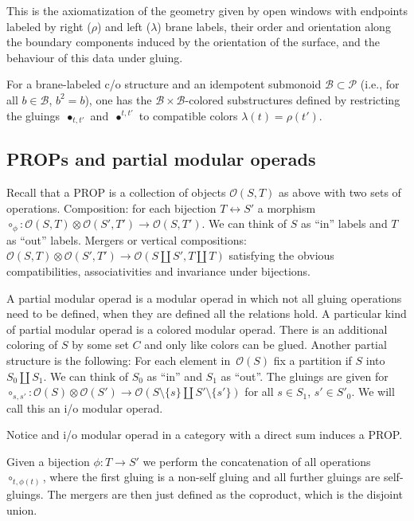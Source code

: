 \documentclass[pdftex]{sigma}
\def\calO{{\mathcal O}}
\def\B{\mathcal B}
\begin{document}
This is the axiomatization  of the geometry given by open windows
with endpoints labeled by right ($\rho$) and left ($\lambda $) brane labels, their order and
orientation along the boundary components induced by the
orientation of the surface, and the behaviour of this data under
gluing.



 For a brane-labeled c/o structure and an idempotent submonoid $\B
 \subset \mathcal{P}$ (i.e., for all $b\in \B$, $b^2=b$),
 one has the {\rm
$\B\times \B$-colored} substructures def\/ined by restricting the
gluings~$\bullet_{t,t'}$ and~$\bullet^{t,t'}$ to compatible colors
$\lambda(t)=\rho(t')$.

\subsection{PROPs and partial modular operads}

Recall that a PROP is a collection of objects $\calO(S,T)$ as above
with two sets of operations. Composition: for each bijection
$T\leftrightarrow S'$ a morphism $\circ_{\phi}:\calO(S,T)\otimes
\calO(S',T')\to \calO(S,T')$. We can think of $S$ as ``in'' labels
and $T$ as ``out'' labels. Mergers or vertical compositions:
$\calO(S,T)\otimes \calO(S',T')\to \calO(S\amalg S',T\amalg T)$
satisfying the obvious compatibilities, associativities and
invariance under bijections.

A partial modular operad is a modular operad in which not all gluing
operations need to be def\/ined, when they are def\/ined all the
relations hold. A particular kind of partial modular  operad is a
colored modular operad. There is an additional coloring of $S$ by
some set $C$ and only like colors can be glued. Another partial
structure is the following: For each element in~$\calO(S)$ f\/ix   a
partition if $S$ into $S_0\amalg S_1$. We can think of $S_0$ as
``in'' and $S_1$ as ``out''. The gluings are given for
$\circ_{s,s'}:\calO(S)\otimes \calO(S')\to
\calO(S\setminus\{s\}\amalg S'\setminus\{s'\})$ for all $s\in
S_1$, $s'\in S'_0$. We will call this an i/o modular operad.

Notice and i/o modular operad in a category with a direct sum induces a PROP.

Given a bijection $\phi: T\to S'$ we  perform the concatenation of
all operations $\circ_{t,\phi(t)}$, where the f\/irst gluing is a
non-self gluing and all further gluings are self-gluings. The
mergers are then just def\/ined as the coproduct, which is the
disjoint union.
\end{document}
